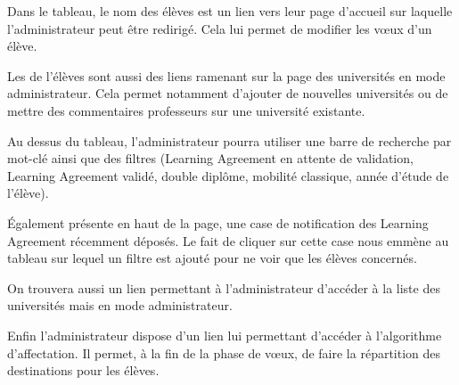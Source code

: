  \bigbreak
 
Dans le tableau, le nom des élèves est un lien vers leur page d'accueil sur laquelle l'administrateur peut être redirigé. Cela lui permet de modifier les vœux d'un élève.

Les \voe de l'élèves sont aussi des liens ramenant sur la page des universités en mode administrateur. Cela permet notamment d'ajouter de nouvelles universités ou de mettre des commentaires professeurs sur une université existante.

Au dessus du tableau, l'administrateur pourra utiliser une barre de recherche par mot-clé ainsi que des filtres (Learning Agreement en attente de validation, Learning Agreement validé, double diplôme, mobilité classique, année d'étude de l'élève).

\bigbreak

Également présente en haut de la page, une case de notification des Learning Agreement récemment déposés. Le fait de cliquer sur cette case nous emmène au tableau sur lequel un filtre est ajouté pour ne voir que les élèves concernés.

\bigbreak

On trouvera aussi un lien permettant à l'administrateur d'accéder à la liste des universités mais en mode administrateur.

\bigbreak

Enfin l'administrateur dispose d'un lien lui permettant d'accéder à l'algorithme d'affectation. Il permet, à la fin de la phase de vœux, de faire la répartition des destinations pour les élèves.